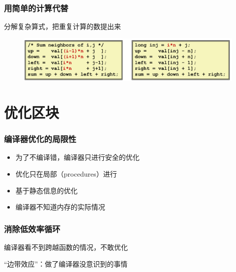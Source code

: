 \documentclass[12pt,AutoFakeBold,aspectratio=169,mathserif]{beamer}
\begin{document}
{\begin{frame}
    \end{frame}

    \begin{frame}
        \frametitle{用简单的计算代替}
    
        分解复杂算式，把重复计算的数提出来
        \begin{figure}
            \includegraphics[width=\textwidth]{figures/3.png}
        \end{figure}
    
    \end{frame}

    \section{优化区块}

    \begin{frame}
        \frametitle{编译器优化的局限性}
    
        \begin{itemize}
            \item 为了不编译错，编译器只进行安全的优化
            \item 优化只在局部（procedures）进行
            \item 基于静态信息的优化
            \item 编译器不知道内存的实际情况
        \end{itemize}
    
    \end{frame}

    \begin{frame}
        \frametitle{消除低效率循环}
    
        编译器看不到跨越函数的情况，不敢优化

        “边带效应”：做了编译器没意识到的事情


        \begin{figure}
        \end{figure}
    

\end{frame}}
\end{document}
